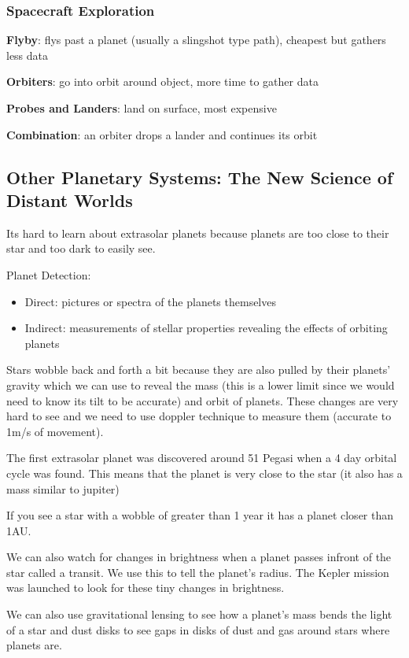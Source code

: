 \documentclass[12pt]{article}
\begin{document}
\subsubsection{Spacecraft Exploration}
\textbf{Flyby}: flys past a planet (usually a slingshot type path), cheapest but gathers less data

\textbf{Orbiters}: go into orbit around object, more time to gather data

\textbf{Probes and Landers}: land on surface, most expensive

\textbf{Combination}: an orbiter drops a lander and continues its orbit

\subsection{Other Planetary Systems: The New Science of Distant Worlds}
Its hard to learn about extrasolar planets because planets are too close to their star and too dark to easily see.

Planet Detection:
\begin{itemize}
\item Direct: pictures or spectra of the planets themselves
\item Indirect: measurements of stellar properties revealing the effects of orbiting planets
\end{itemize}

Stars wobble back and forth a bit because they are also pulled by their planets' gravity which we can use to reveal the mass (this is a lower limit since we would need to know its tilt to be accurate) and orbit of planets. These changes are very hard to see and we need to use doppler technique to measure them (accurate to 1m/s of movement).

The first extrasolar planet was discovered around 51 Pegasi when a 4 day orbital cycle was found. This means that the planet is very close to the star (it also has a mass similar to jupiter)

If you see a star with a wobble of greater than 1 year it has a planet closer than 1AU.

We can also watch for changes in brightness when a planet passes infront of the star called a transit. We use this to tell the planet's radius. The Kepler mission was launched to look for these tiny changes in brightness.

We can also use gravitational lensing to see how a planet's mass bends the light of a star and dust disks to see gaps in disks of dust and gas around stars where planets are.
\end{document}
